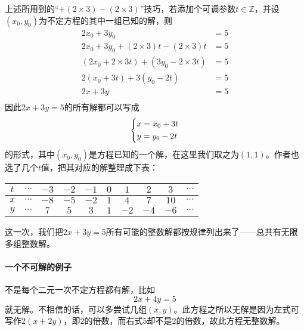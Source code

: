 \documentclass[a4,12pt]{article}
\begin{document}
	上述所用到的“$+ (2\times3) - (2\times3)$”技巧，若添加个可调参数$t\in\mathbb{Z}$，并设$(x_0, y_0)$为不定方程的其中一组已知的解，则
	\[ \begin{aligned}
			2x_0 + 3y_0 &= 5 \\
			2x_0 + 3y_0 + (2\times3)t - (2\times3)t &= 5 \\
			(2x_0 + 2\times3t) + (3y_0 - 2\times3t) &= 5 \\
			2(x_0+3t) + 3(y_0-2t) &= 5 \\
			2x + 3y &= 5 \\
		\end{aligned}
	\]
	因此$2x + 3y = 5$的所有解都可以写成
	\[ \begin{dcases}
			x = x_0 + 3t \\
			y = y_0 - 2t
		\end{dcases}
	\]
	的形式，其中$(x_0, y_0)$是方程已知的一个解，在这里我们取之为$(1, 1)$。作者也选了几个$t$值，把其对应的解整理成下表：
	\begin{center}
	\begin{tabular}{c|ccccccccc}
		$t$ & $\cdots$ & $-3$ & $-2$ & $-1$ & $0$ & $1$ & $2$ & $3$ & $\cdots$ \\
		\hline
		$x$ & $\cdots$ & $-8$ & $-5$ & $-2$ & $1$ & $4$ & $7$ & $10$ & $\cdots$ \\
		$y$ & $\cdots$ & $7$ & $5$ & $3$ & $1$ & $-2$ & $-4$ & $-6$ & $\cdots$ \\
	\end{tabular}
	\end{center}
	这一次，我们把$2x+3y=5$所有可能的整数解都按规律列出来了——总共有无限多组整数解。

\paragraph{一个不可解的例子}
	不是每个二元一次不定方程都有解，比如
	\[ 2x + 4y = 5 \]
	就无解。不相信的话，可以多尝试几组$(x, y)$。此方程之所以无解是因为左式可写作$2(x + 2y)$，即$2$的倍数，而右式$5$却不是$2$的倍数，故此方程无整数解。
\end{document}
